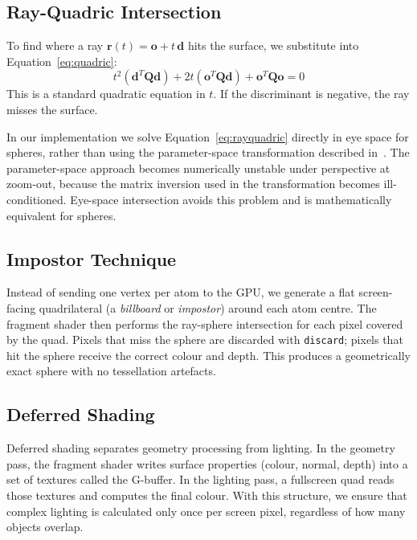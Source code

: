 \documentclass[12pt, a4paper]{article}
\begin{document}
\subsection{Ray-Quadric Intersection}

To find where a ray $\mathbf{r}(t) = \mathbf{o} + t\,\mathbf{d}$ hits the surface, we substitute into Equation~\ref{eq:quadric}:
\begin{equation}
    t^2 (\mathbf{d}^T \mathbf{Q} \mathbf{d})
    + 2t (\mathbf{o}^T \mathbf{Q} \mathbf{d})
    + \mathbf{o}^T \mathbf{Q} \mathbf{o} = 0
    \label{eq:rayquadric}
\end{equation}
This is a standard quadratic equation in $t$. If the discriminant is negative, the ray misses the surface.

In our implementation we solve Equation~\ref{eq:rayquadric} directly in eye space for spheres, rather than using the parameter-space transformation described in~\cite{sigg2006}. The parameter-space approach becomes numerically unstable under perspective at zoom-out, because the matrix inversion used in the transformation becomes ill-conditioned. Eye-space intersection avoids this problem and is mathematically equivalent for spheres.

\subsection{Impostor Technique}

Instead of sending one vertex per atom to the GPU, we generate a flat screen-facing quadrilateral (a \emph{billboard} or \emph{impostor}) around each atom centre. The fragment shader then performs the ray-sphere intersection for each pixel covered by the quad. Pixels that miss the sphere are discarded with \texttt{discard}; pixels that hit the sphere receive the correct colour and depth. This produces a geometrically exact sphere with no tessellation artefacts.

\subsection{Deferred Shading}

Deferred shading separates geometry processing from lighting. In the geometry pass, the fragment shader writes surface properties (colour, normal, depth) into a set of textures called the G-buffer. In the lighting pass, a fullscreen quad reads those textures and computes the final colour. With this structure, we ensure that complex lighting is calculated only once per screen pixel, regardless of how many objects overlap.
\clearpage
\end{document}
